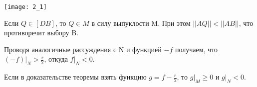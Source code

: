 \begin{Proof}
	\begin{center}
		\texttt{[image: 2\_1]}
	\end{center}

	Если $Q \in [DB]$, то $Q \in M$ в силу выпуклости M. При этом $||AQ|| < ||AB||$, что противоречит выбору B.

	Проводя аналогичные рассуждения с N и функцией $-f$ получаем, что $(-f)|_N > \frac{r}{2}$, откуда $f|_N < 0$.
\end{Proof}

\begin{conseq}[]\label{cha:2/conseq:1}
	Если в доказательстве теоремы взять функцию $g = f - \frac{r}{2}$, то $g|_M \ge 0$ и $g|_N < 0$.
\end{conseq}

















